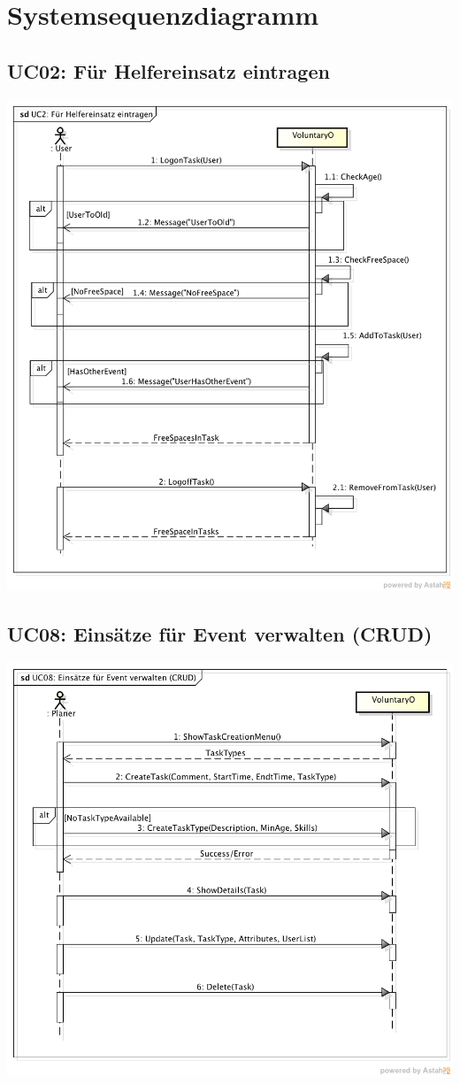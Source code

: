 \chapter{Systemsequenzdiagramm}
 \section{UC02: Für Helfereinsatz eintragen}
 	\includegraphics[width=\textwidth]{content/domainanalyse/images/UC2_Helfereinsatz_eintragen.png}


 \section{UC08: Einsätze für Event verwalten (CRUD)}
 	\includegraphics[width=\textwidth]{content/domainanalyse/images/UC08_Einsaetze_fuer_Event_verwalten.png}
